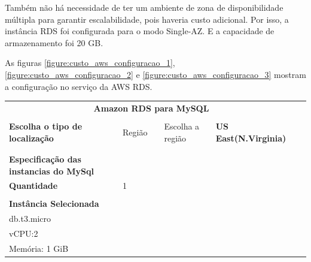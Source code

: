 Também não há necessidade de ter um ambiente de zona de disponibilidade múltipla para garantir escalabilidade, pois haveria custo adicional. Por isso, a instância RDS foi configurada para o modo Single-AZ. E a capacidade de armazenamento foi 20 GB.

As figuras \ref{figure:custo_aws_configuracao_1}, \ref{figure:custo_aws_configuracao_2} e \ref{figure:custo_aws_configuracao_3} mostram a configuração no serviço da AWS RDS.

\begin{table}[]
\begin{tabular}{llllll}
\multicolumn{5}{c}{\textbf{Amazon RDS para MySQL}}                                                           &  \\
                                               &        &  &                  &                              &  \\
\textbf{Escolha o tipo de localização}         & Região &  & Escolha a região & \textbf{US East(N.Virginia)} &  \\
                                               &        &  &                  &                              &  \\
                                               &        &  &                  &                              &  \\
\textbf{Especificação das instancias do MySql} &        &  &                  &                              &  \\
\textbf{Quantidade}                            & 1      &  &                  &                              &  \\
                                               &        &  &                  &                              &  \\
\textbf{Instância Selecionada}                 &        &  &                  &                              &  \\
db.t3.micro                                    &        &  &                  &                              &  \\
vCPU:2                                         &        &  &                  &                              &  \\
Memória: 1 GiB                                 &        &  &                  &                              & 
\end{tabular}
\end{table}

